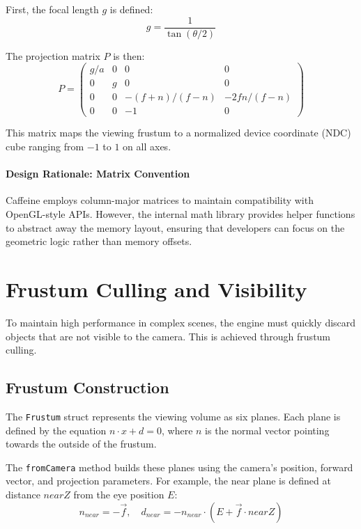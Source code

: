 First, the focal length $g$ is defined:
\begin{equation}
    g = \frac{1}{\tan(\theta/2)}
\end{equation}

The projection matrix $P$ is then:
\begin{equation}
    P = \begin{pmatrix}
        g/a & 0 & 0 & 0 \\
        0 & g & 0 & 0 \\
        0 & 0 & -(f+n)/(f-n) & -2fn/(f-n) \\
        0 & 0 & -1 & 0
    \end{pmatrix}
\end{equation}

This matrix maps the viewing frustum to a normalized device coordinate (NDC) cube ranging from $-1$ to $1$ on all axes.


\paragraph{Design Rationale: Matrix Convention}

Caffeine employs column-major matrices to maintain compatibility with OpenGL-style APIs. However, the internal math library provides helper functions to abstract away the memory layout, ensuring that developers can focus on the geometric logic rather than memory offsets.



\section{Frustum Culling and Visibility}

To maintain high performance in complex scenes, the engine must quickly discard objects that are not visible to the camera. This is achieved through frustum culling.

\subsection{Frustum Construction}

The \texttt{Frustum} struct represents the viewing volume as six planes. Each plane is defined by the equation $n \cdot x + d = 0$, where $n$ is the normal vector pointing towards the outside of the frustum.

The \texttt{fromCamera} method builds these planes using the camera's position, forward vector, and projection parameters. For example, the near plane is defined at distance $nearZ$ from the eye position $E$:
\begin{equation}
    n_{near} = -\vec{f}, \quad d_{near} = -n_{near} \cdot (E + \vec{f} \cdot nearZ)
\end{equation}

